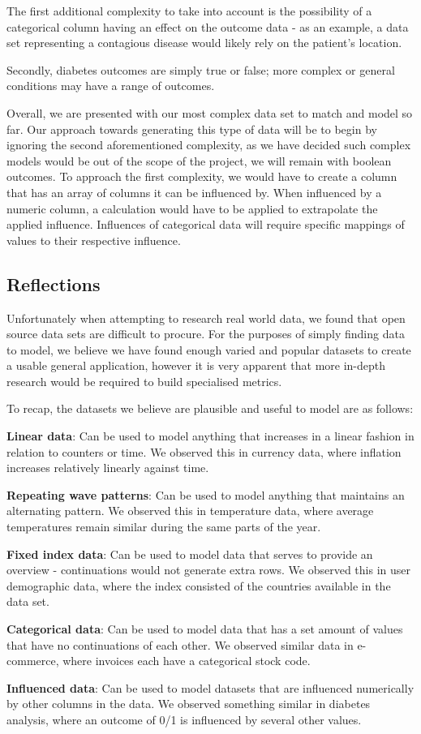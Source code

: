 The first additional complexity to take into account is the possibility of a categorical column having an effect on the
outcome data - as an example, a data set representing a contagious disease would likely rely on the patient's location.

Secondly, diabetes outcomes are simply true or false;
more complex or general conditions may have a range of outcomes.

Overall, we are presented with our most complex data set to match and model so far.
Our approach towards generating this type of data will be to begin by ignoring the second aforementioned complexity, as
we have decided such complex models would be out of the scope of the project, we will remain with boolean outcomes.
To approach the first complexity, we would have to create a column that has an array of columns it can be influenced by.
When influenced by a numeric column, a calculation would have to be applied to extrapolate the applied influence.
Influences of categorical data will require specific mappings of values to their respective influence.

\subsection{Reflections}

Unfortunately when attempting to research real world data, we found that open source data sets are difficult to procure.
For the purposes of simply finding data to model, we believe we have found enough varied and popular datasets to
create a usable general application, however it is very apparent that more in-depth research would be required to build
specialised metrics.


To recap, the datasets we believe are plausible and useful to model are as follows:

\textbf{Linear data}: Can be used to model anything that increases in a linear fashion in relation to counters or time.
We observed this in currency data, where inflation increases relatively linearly against time.

\textbf{Repeating wave patterns}: Can be used to model anything that maintains an alternating pattern.
We observed this in temperature data, where average temperatures remain similar during the same parts of the year.

\textbf{Fixed index data}: Can be used to model data that serves to provide an overview - continuations would not
generate extra rows.
We observed this in user demographic data, where the index consisted of the countries available in the data set.

\textbf{Categorical data}: Can be used to model data that has a set amount of values that have no continuations
of each other.
We observed similar data in e-commerce, where invoices each have a categorical stock code.

\textbf{Influenced data}: Can be used to model datasets that are influenced numerically by other columns in the data.
We observed something similar in diabetes analysis, where an outcome of 0/1 is influenced by several other values.